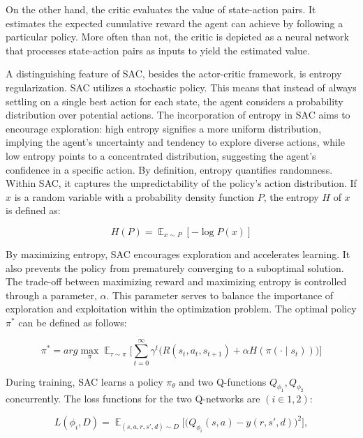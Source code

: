 On the other hand, the critic evaluates the value of state-action pairs. It estimates the expected cumulative reward the agent can achieve by following a particular policy. More often than not, the critic is depicted as a neural network that processes state-action pairs as inputs to yield the estimated value.

A distinguishing feature of SAC, besides the actor-critic framework, is entropy regularization\cite{achiam2018spinning}. SAC utilizes a stochastic policy. This means that instead of always settling on a single best action for each state, the agent considers a probability distribution over potential actions. The incorporation of entropy in SAC aims to encourage exploration: high entropy signifies a more uniform distribution, implying the agent's uncertainty and tendency to explore diverse actions, while low entropy points to a concentrated distribution, suggesting the agent's confidence in a specific action. By definition, entropy quantifies randomness. Within SAC, it captures the unpredictability of the policy's action distribution. If
\(x\) is a random variable with a probability density function \(P\), the
entropy \(H\) of \(x\) is defined as:

\begin{equation}
 H(P) = \displaystyle \mathop{\mathbb{E}}_{x \sim P}[-\log P(x)]
\end{equation}

By maximizing entropy, SAC encourages exploration and accelerates learning. It
also prevents the policy from prematurely converging to a suboptimal solution.
The trade-off between maximizing reward and maximizing entropy is controlled
through a parameter, \(\alpha\). This parameter serves to balance the importance
of exploration and exploitation within the optimization problem. The optimal policy
\(\pi^*\) can be defined as follows:

\begin{equation}
 \pi^* = {arg}{\max_{\pi}}{\displaystyle
 \mathop{\mathbb{E}}_{\tau\sim\pi}}{\Bigg[{\sum_{t=0}^{\infty}}{\gamma^{t}}{\Big(R(s_t,a_t,s_{t+1})}+{\alpha}H(\pi(\cdot\mid{s_t}))\Big)\Bigg]}
\end{equation}

During training, SAC learns a policy $\pi_{\theta}$ and two Q-functions
$Q_{\phi_1} , Q_{\phi_2}$ concurrently. The loss functions for the two Q-networks are
$(i \in {1, 2})$:

\begin{equation}
  L(\phi_i,D) = \displaystyle
  \mathop{\mathbb{E}}_{(s,a,r,s',d)\sim{D}}\bigg[\bigg(Q_{\phi_i}(s,a)-y(r,s',d)\bigg)^2\bigg],
\end{equation}

